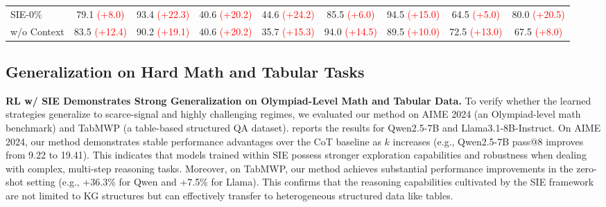 \documentclass{article} %
\newcommand{\posgain}[1]{\textcolor{red}{(+#1)}}
\begin{document}
\begin{table}[t!]
{\begin{tabular}{l cc cc cc cc}
SIE-0\%       & 79.1 \posgain{8.0} & 93.4 \posgain{22.3} & 40.6 \posgain{20.2} & 44.6 \posgain{24.2} & 85.5 \posgain{6.0} & 94.5 \posgain{15.0} & 64.5 \posgain{5.0} & 80.0 \posgain{20.5} \\
w/o Context & 83.5 \posgain{12.4} & 90.2 \posgain{19.1} & 40.6 \posgain{20.2} & 35.7 \posgain{15.3} & 94.0 \posgain{14.5} & 89.5 \posgain{10.0} & 72.5 \posgain{13.0} & 67.5 \posgain{8.0}  \\
\bottomrule
\end{tabular}%
}
\end{table}


\subsection{Generalization on Hard Math and Tabular Tasks}
\label{app:aime_tabmwp}


\textbf{RL w/ SIE Demonstrates Strong Generalization on Olympiad-Level Math and Tabular Data.}
To verify whether the learned strategies generalize to scarce-signal and highly challenging regimes, we evaluated our method on AIME 2024 (an Olympiad-level math benchmark) and TabMWP \citep{lu2022dynamic} (a table-based structured QA dataset).
 reports the results for Qwen2.5-7B and Llama3.1-8B-Instruct.
On AIME 2024, our method demonstrates stable performance advantages over the CoT baseline as $k$ increases (e.g., Qwen2.5-7B pass@8 improves from 9.22 to 19.41). This indicates that models trained within SIE possess stronger exploration capabilities and robustness when dealing with complex, multi-step reasoning tasks.
Moreover, on TabMWP, our method achieves substantial performance improvements in the zero-shot setting (e.g., +36.3\% for Qwen and +7.5\% for Llama). This confirms that the reasoning capabilities cultivated by the SIE framework are not limited to KG structures but can effectively transfer to heterogeneous structured data like tables.
\end{document}
